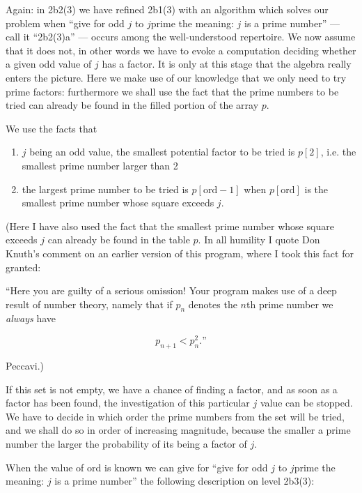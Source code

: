 Again: in 2b2(3) we have refined 2b1(3) with an algorithm which solves our problem when ``give for odd $j$ to $j$prime the meaning: $j$ is a prime number'' --- call it ``2b2(3)a'' --- occurs among the well-understood repertoire. We now assume that it does not, in other words we have to evoke a computation deciding whether a given odd value of $j$ has a factor. It is only at this stage that the algebra really enters the picture. Here we make use of our knowledge that we only need to try prime factors: furthermore we shall use the fact that the prime numbers to be tried can already be found in the filled portion of the array $p$.

We use the facts that

\begin{enumerate}[leftmargin=2\parindent, label=(\arabic*)]
	\item $j$ being an odd value, the smallest potential factor to be tried is $p[2]$, i.e. the smallest prime number larger than 2

	\item the largest prime number to be tried is $p[\text{ord} - 1]$ when $p[\text{ord}]$ is the smallest prime number whose square exceeds $j$.
\end{enumerate}

(Here I have also used the fact that the smallest prime number whose square exceeds $j$ can already be found in the table $p$. In all humility I quote Don Knuth's comment on an earlier version of this program, where I took this fact for granted:

\begin{addmargin}[\parindent]{0em}
``Here you are guilty of a serious omission! Your program makes use of a deep result of number theory, namely that if $p_n$ denotes the $n$th prime number we \textit{always} have
\end{addmargin}
$$
p_{n+1}<p_n^2.\text{''}
$$

\noindent
Peccavi.)

If this set is not empty, we have a chance of finding a factor, and as soon as a factor has been found, the investigation of this particular $j$ value can be stopped. We have to decide in which order the prime numbers from the set will be tried, and we shall do so in order of increasing magnitude, because the smaller a prime number the larger the probability of its being a factor of $j$.

When the value of ord is known we can give for ``give for odd $j$ to $j$prime the meaning: $j$ is a prime number'' the following description on level 2b3(3):

